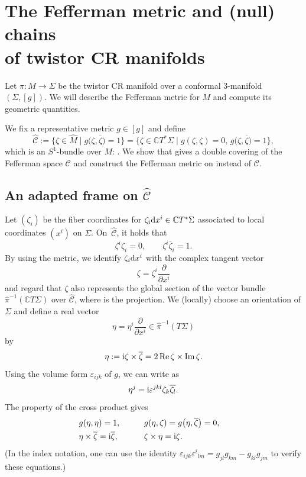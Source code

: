 \documentclass[11pt]{article}
\numberwithin{equation}{section}
\newcommand\e{\varepsilon}
\newcommand\ol{\overline}
\newcommand{\wh}{\widehat}
\numberwithin{equation}{section}
\begin{document}
\section[The Fefferman metric and (null) chains of twistor CR manifolds]{The Fefferman metric and (null) chains\\ of twistor CR manifolds}\label{Fefferman-twistor-CR}
Let $\pi\colon M\to \Sigma$ be the twistor CR manifold over a conformal $3$-manifold $(\Sigma, [g])$. We will describe the Fefferman metric for $M$ and compute its geometric quantities.

We fix a representative metric $g\in[g]$ and define
\[
\wh{\mathcal{C}}:=\bigl\{\zeta\in \hat M\mid g\bigl(\zeta, \ol\zeta\bigr)=1\bigr\}
=\bigl\{\zeta\in\mathbb{C}T^*\Sigma\mid g(\zeta, \zeta)=0,\, g\bigl(\zeta, \ol\zeta\bigr)=1\bigr\},
\]
which is an $S^1$-bundle over $M$: \smash{$\wh{\mathcal{C}}/\mathrm{U}(1)=M$}.
We show that \smash{$\wh{\mathcal{C}}$} gives a double covering of the Fefferman space $\mathcal{C}$ and construct the Fefferman metric on \smash{$\wh{\mathcal{C}}$} instead of $\mathcal{C}$.



\subsection[An adapted frame on wh{C}]{An adapted frame on $\boldsymbol{\wh{\mathcal{C}}}$}
Let $(\zeta_i)$ be the fiber coordinates for $\zeta_i{\rm d}x^i\in \mathbb{C}T^*\Sigma$ associated to local coordinates $(x^i)$ on $\Sigma$. On~$\wh{\mathcal{C}}$, it holds that
\[
\zeta^i\zeta_i=0, \qquad \zeta^i\ol\zeta_i=1.
\]
By using the metric, we identify $\zeta_i {\rm d}x^i$ with the complex tangent vector
\[
\zeta=\zeta^i\frac{\partial}{\partial x^i}
\]
and regard that $\zeta$ also represents the global section of the vector bundle
$\hat\pi^{-1}(\mathbb{C}T\Sigma)$ over $\wh{\mathcal{C}}$, where \smash{$\hat\pi\colon \wh{\mathcal{C}}\to \Sigma$} is the projection. We (locally) choose an orientation of $\Sigma$ and define a real vector
\[
\eta=\eta^i\frac{\partial}{\partial x^i}\in \hat\pi^{-1}(T\Sigma)
\]
by
\[
\eta:={\rm i}\zeta\times \ol\zeta=2\operatorname{Re}\zeta\times \operatorname{Im}\zeta.
\]
Using the volume form $\e_{ijk}$ of $g$, we can write as
\[
\eta^j={\rm i}\e^{jkl}\zeta_k\ol{\zeta_l}.
\]
The property of the cross product gives
\begin{alignat*}{3}
&g(\eta, \eta)=1, \qquad&& g(\eta, \zeta)=g\bigl(\eta, \ol\zeta\bigr)=0,& \\
&\eta\times\ol\zeta={\rm i}\ol\zeta, \qquad&& \zeta\times\eta={\rm i}\zeta.&
\end{alignat*}
(In the index notation, one can use the identity $\e_{ijk}\e^i{}_{lm}=g_{jl}g_{km}-g_{kl}g_{jm}$ to verify these equations.)
\end{document}
